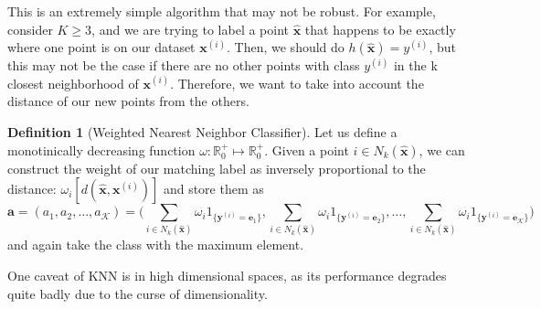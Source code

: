 \documentclass{article}
\theoremstyle{definition}
\theoremstyle{remark}
\theoremstyle{definition}
\newtheorem{definition}{Definition}[section]
\begin{document}
This is an extremely simple algorithm that may not be robust. For example, consider $K \geq 3$, and we are trying to label a point $\hat{\mathbf{x}}$ that happens to be exactly where one point is on our dataset $\mathbf{x}^{(i)}$. Then, we should do $h(\hat{\mathbf{x}}) = y^{(i)}$, but this may not be the case if there are no other points with class $y^{(i)}$ in the k closest neighborhood of $\mathbf{x}^{(i)}$. Therefore, we want to take into account the distance of our new points from the others. 

\begin{definition}[Weighted Nearest Neighbor Classifier]
Let us define a monotinically decreasing function $\omega: \mathbb{R}_0^+ \mapsto \mathbb{R}_0^+$. Given a point $i \in N_k (\hat{\mathbf{x}})$, we can construct the weight of our matching label as inversely proportional to the distance: $\omega_i [ d(\hat{\mathbf{x}}, \mathbf{x}^{(i)})]$ and store them as 
\[\mathbf{a} = (a_1, a_2, \ldots, a_\mathcal{K}) = \bigg( \sum_{i \in N_k (\hat{\mathbf{x}})} \omega_i 1_{\{\mathbf{y}^{(i)} = \mathbf{e}_1\}}, \sum_{i \in N_k (\hat{\mathbf{x}})} \omega_i 1_{\{\mathbf{y}^{(i)} = \mathbf{e}_2\}}, \ldots, \sum_{i \in N_k (\hat{\mathbf{x}})} \omega_i 1_{\{\mathbf{y}^{(i)} = \mathbf{e}_\mathcal{K}\}} \bigg)  \]
and again take the class with the maximum element. 
\end{definition}

One caveat of KNN is in high dimensional spaces, as its performance degrades quite badly due to the curse of dimensionality. 
\end{document}
